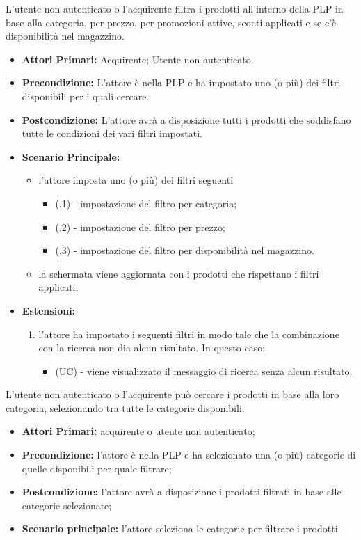 L'utente non autenticato o l'acquirente filtra i prodotti all'interno della PLP in base alla categoria, per prezzo, per promozioni attive, sconti applicati e se c'è disponibilità nel magazzino.
\begin{itemize}
    \item \textbf{Attori Primari:} Acquirente; Utente non autenticato.
    \item \textbf{Precondizione:} L'attore è nella PLP e ha impostato uno (o più) dei filtri disponibili per i quali cercare.
    \item \textbf{Postcondizione:} L'attore avrà a disposizione tutti i prodotti che soddisfano tutte le condizioni dei vari filtri impostati.
    \item \textbf{Scenario Principale:}
    \begin{itemize}
        \item l'attore imposta uno (o più) dei filtri seguenti 
        \begin{itemize}
            \item (\actualUC.1) - impostazione del filtro per categoria;
            \item (\actualUC.2) - impostazione del filtro per prezzo;
            \item (\actualUC.3) - impostazione del filtro per disponibilità nel magazzino.
        \end{itemize}
        \item la schermata viene aggiornata con i prodotti che rispettano i filtri applicati;
    \end{itemize}
    \item \textbf{Estensioni:}
    \begin{enumerate}
        \item l'attore ha impostato i seguenti filtri in modo tale che la combinazione con la ricerca non dia alcun risultato. In questo caso:
        \begin{itemize}
            \item (UC) - viene visualizzato il messaggio di ricerca senza alcun risultato.
        \end{itemize}
    \end{enumerate}
\end{itemize}

\resetSubUC

L'utente non autenticato o l'acquirente può cercare i prodotti in base alla loro categoria, selezionando tra tutte le categorie disponibili.
\begin{itemize}
    \item \textbf{Attori Primari:} acquirente o utente non autenticato;
    \item \textbf{Precondizione:} l'attore è nella PLP e ha selezionato una (o più) categorie di quelle disponibili per quale filtrare;
    \item \textbf{Postcondizione:} l'attore avrà a disposizione i prodotti filtrati in base alle categorie selezionate;
    \item \textbf{Scenario principale:} l'attore seleziona le categorie per filtrare i prodotti.
\end{itemize}

